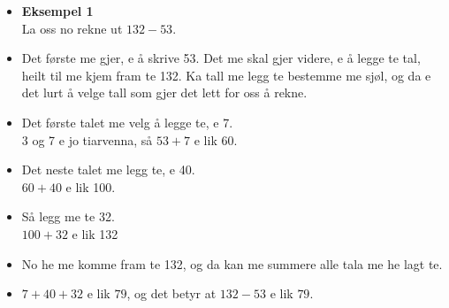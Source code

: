\documentclass[english,hidelinks,pdftex, 11 pt, class=report,crop=false]{standalone}
\begin{document}
\begin{itemize}
\item \textbf{Eksempel 1}\\
La oss no rekne ut $ 132-53 $. 
\item Det første me gjer, e å skrive 53. Det me skal gjer videre, e å legge te tal, heilt til me kjem fram te 132. Ka tall me legg te bestemme me sjøl, og da e det lurt å velge tall som gjer det lett for oss å rekne.
\item Det første talet me velg å legge te, e 7.\\ 3 og 7 e jo tiarvenna, så $ 53+7 $ e lik 60.
\item Det neste talet me legg te, e 40.\\
$ 60+40 $ e lik 100.
\item Så legg me te 32. \\
$ 100+32 $ e lik 132
\item No he me komme fram te 132, og da kan me summere alle tala me he lagt te.
\item $ 7+40+32 $ e lik $ 79 $, og det betyr at $ 132-53 $ e lik $ 79 $.



\end{itemize}
\end{document}
